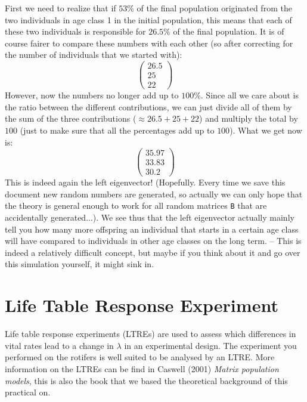 \documentclass{article}\usepackage[]{graphicx}\usepackage[]{color}
\begin{document}
\begin{mdframed}
First we need to realize that if $53\% $ of the final population originated from the two individuals in age class 1 in the initial population, this means that each of these two individuals is responsible for $26.5\% $ of the final population. It is of course fairer to compare these numbers with each other (so after correcting for the number of individuals that we started with):
\begin{equation*}
\begin{pmatrix}
26.5 \\
25 \\
22
\end{pmatrix}
\end{equation*}
However, now the numbers no longer add up to $100\%$. Since all we care about is the ratio between the different contributions, we can just divide all of them by the sum of the three contributions ($\approx 26.5 +25 + 22 $) and multiply the total by $100$ (just to make sure that all the percentages add up to $100$). What we get now is: 
\begin{equation*}
\begin{pmatrix}
35.97 \\
33.83 \\
30.2
\end{pmatrix}
\end{equation*}
This is indeed again the left eigenvector! (Hopefully. Every time we save this document new random numbers are generated, so actually we can only hope that the theory is general enough to work for all random matrices \texttt{B} that are accidentally generated...). We see thus that the left eigenvector actually mainly tell you how many more offspring an individual that starts in a certain age class will have compared to individuals in other age classes on the long term. -- This is indeed a relatively difficult concept, but maybe if you think about it and go over this simulation yourself, it might sink in.
\end{mdframed}
\section{Life Table Response Experiment}
Life table response experiments (LTREs) are used to assess which  differences in vital rates lead to a change in $\lambda$ in an experimental design. The experiment you performed on the rotifers is well suited to be analysed by an LTRE. More information on the LTREs can be find in Caswell (2001) \textit{Matrix population models}, this is also the book that we based the theoretical background of this practical on. 
\end{document}
